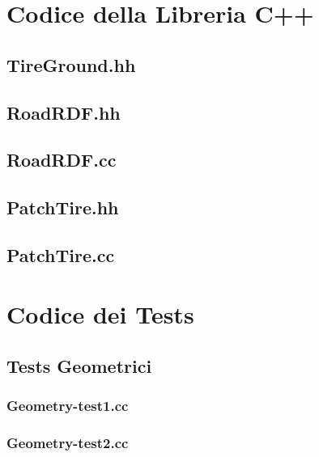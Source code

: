 \chapter{Codice della Libreria C++}
\label{LibraryCode}
%
\section{TireGround.hh}
\footnotesize
\renewcommand{\baselinestretch}{1.0}

\renewcommand{\baselinestretch}{1.25}
%
\section{RoadRDF.hh}
\renewcommand{\baselinestretch}{1.0}

\renewcommand{\baselinestretch}{1.25}
%
\section{RoadRDF.cc}
\renewcommand{\baselinestretch}{1.0}

\renewcommand{\baselinestretch}{1.25}
%
\section{PatchTire.hh}
\renewcommand{\baselinestretch}{1.0}

\renewcommand{\baselinestretch}{1.25}
%
\section{PatchTire.cc}
\renewcommand{\baselinestretch}{1.0}

\renewcommand{\baselinestretch}{1.25}
%
\chapter{Codice dei Tests}
\label{TestsCode}
%
\section{Tests Geometrici}
%
\subsection{Geometry-test1.cc}
\renewcommand{\baselinestretch}{1.0}

\renewcommand{\baselinestretch}{1.25}
%
\subsection{Geometry-test2.cc}
\renewcommand{\baselinestretch}{1.0}

\renewcommand{\baselinestretch}{1.25}
%
